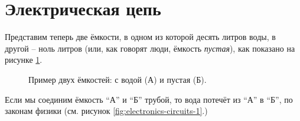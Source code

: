 \documentclass[../sparc.tex]{subfiles}
\begin{document}
\section{Электрическая цепь}

Представим теперь две ёмкости, в одном из которой десять литров воды, в другой --
ноль литров (или, как говорят люди, ёмкость \emph{пустая}), как показано на
рисунке \ref{fig:electronics-circuits-0}.

\begin{figure}[ht]
  \centering
  \caption{Пример двух ёмкостей: с водой (А) и пустая (Б).}
  \label{fig:electronics-circuits-0}
\end{figure}

Если мы соединим ёмкость ``А'' и ``Б'' трубой, то вода потечёт из ``А'' в ``Б'',
по законам физики (см. рисунок \ref{fig:electronics-circuits-1}.)
\end{document}
